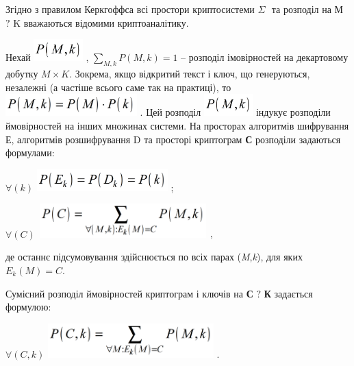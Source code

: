 \documentclass[a4paper]{article}
\newcounter{}
\begin{document}
 Згідно з правилом Керкгоффса  всі простори криптосистеми   ${\Sigma }$ $ $ та
розподіл на  М ${?}$ K  вважаються відомими криптоаналітику.


\bigskip

Нехай 
\includegraphics[width=0.7437in,height=0.3339in]{crypt-img/crypt-img13.png} , 
${\underset{{M,k}}{\sum }{P(M,k)=1}}$  – розподіл імовірностей на декартовому
добутку  ${M\times K}$. Зокрема, якщо відкритий текст і ключ, що генеруються,
незалежні (а частіше всього саме так на практиці), то 
\includegraphics[width=1.9992in,height=0.3346in]{crypt-img/crypt-img14.png} .
Цей розподіл 
\includegraphics[width=0.7437in,height=0.3339in]{crypt-img/crypt-img15.png}  
індукує розподіли ймовірностей на інших множинах системи.  На просторах
алгоритмів шифрування Е, алгоритмів розшифрування  D та просторі  криптограм 
\textbf{С}  розподіли задаються формулами:

{\centering
 ${\forall (k)}$  
\includegraphics[width=1.9898in,height=0.3335in]{crypt-img/crypt-img16.png} ;
\par}

{\centering
 ${\forall (C)}$   
\includegraphics[width=2.5583in,height=0.5154in]{crypt-img/crypt-img17.png} ,
\par}

де останнє підсумовування здійснюється по всіх парах
(\textit{M},\textit{k}),\textit{ }для яких  ${E_{{k}}(M)=C}$.

Сумісний розподіл ймовірностей  криптограм і ключів  на \textbf{С} ${?}$
\textbf{К} задається формулою:

{\centering
 ${\forall (C,k)}$    
\includegraphics[width=2.5201in,height=0.5209in]{crypt-img/crypt-img18.png} .
\par}
\end{document}
